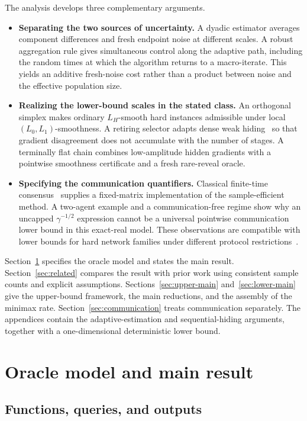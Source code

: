 \documentclass[11pt,a4paper]{article}
\theoremstyle{remark}
\begin{document}
The analysis develops three complementary arguments.
\begin{itemize}
\item \textbf{Separating the two sources of uncertainty.}
A dyadic estimator averages component differences and fresh endpoint noise
at different scales. A robust aggregation rule gives simultaneous control
along the adaptive path, including the random times at which the algorithm
returns to a macro-iterate. This yields an additive fresh-noise cost rather
than a product between noise and the effective population size.
\item \textbf{Realizing the lower-bound scales in the stated class.}
An orthogonal simplex makes ordinary $L_H$-smooth hard instances admissible
under local $(L_0,L_1)$-smoothness. A retiring selector adapts dense weak
hiding~\cite{dense2026} so that gradient disagreement does not accumulate
with the number of stages. A terminally flat chain combines low-amplitude
hidden gradients with a pointwise smoothness certificate and a fresh
rare-reveal oracle.
\item \textbf{Specifying the communication quantifiers.}
Classical finite-time consensus~\cite{finiteconsensus2007} supplies a
fixed-matrix implementation of the sample-efficient method. A two-agent
example and a communication-free regime show why an uncapped
$\gamma^{-1/2}$ expression cannot be a universal pointwise communication
lower bound in this exact-real model. These observations are compatible
with lower bounds for hard network families under different protocol
restrictions~\cite{ludesa2021}.
\end{itemize}

Section~\ref{sec:model} specifies the oracle model and states the main
result. Section~\ref{sec:related} compares the result with prior work using
consistent sample counts and explicit assumptions.
Sections~\ref{sec:upper-main} and~\ref{sec:lower-main} give the upper-bound
framework, the main reductions, and the assembly of the minimax rate.
Section~\ref{sec:communication} treats communication separately.
The appendices contain the adaptive-estimation and sequential-hiding
arguments, together with a one-dimensional deterministic lower bound.

\section{Oracle model and main result}
\label{sec:model}

\subsection{Functions, queries, and outputs}
\end{document}

